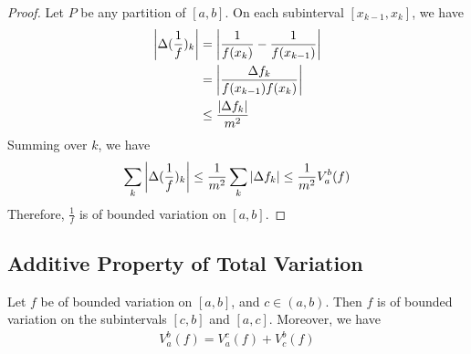 \documentclass[thmcnt=section, color=blue, 12pt]{my-elegantbook}
\begin{document}
\begin{proof}
	Let $P$ be any partition of $[a, b]$.
	On each subinterval $[x_{k-1}, x_k]$, we have
	\begin{align*}
		\left\lvert \Delta (\frac{1}{f})_k \right\rvert
		 & = \left\lvert \frac{1}{f(x_k)} - \frac{1}{f(x_{k-1})} \right\rvert \\
		 & = \left\lvert \frac{\Delta f_k}{f(x_{k-1}) f(x_k)} \right\rvert    \\
		 & \leq \frac{\left\lvert  \Delta f_k  \right\rvert}{m^2}
	\end{align*}
	Summing over $k$, we have
	\begin{align*}
		\sum_k \left\lvert \Delta (\frac{1}{f})_k \right\rvert
		\leq \frac{1}{m^2} \sum_k \left\lvert \Delta f_k \right\rvert
		\leq \frac{1}{m^2} V_a^b (f)
	\end{align*}
	Therefore, $\frac{1}{f}$ is of bounded variation on $[a, b]$.
\end{proof}

\subsection{Additive Property of Total Variation}

\begin{theorem} \label{thm:2}
	Let $f$ be of bounded variation on $[a, b]$, and $c \in (a, b)$.
	Then $f$ is of bounded variation on the subintervals $[c, b]$ and $[a, c]$.
	Moreover, we have
	\begin{align}
		V_a^b(f) = V_a^c(f) + V_c^b(f)
		\label{eq:9}
	\end{align}
\end{theorem}
\end{document}

